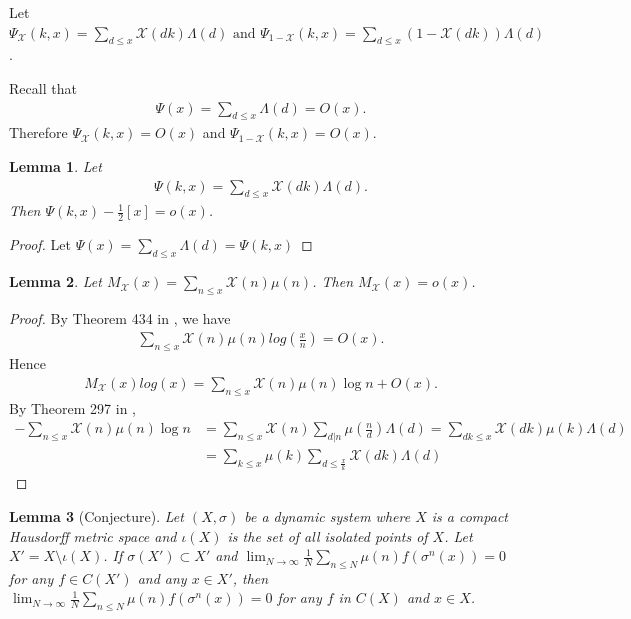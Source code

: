 \documentclass[a4paper,10pt]{amsart}
\newtheorem{lemma}{Lemma}[section]
\newcommand{\X}{\mathcal X}
\begin{document}
Let $\Psi_{\X}(k,x) = \sum_{d \leq x}\X(dk)\Lambda(d) \mbox{ and }
\Psi_{1-\X}(k,x) = \sum_{d \leq x}(1-\X(dk))\Lambda(d)$.

Recall that
\begin{align*}
    \Psi(x) = \sum_{d \leq x}\Lambda(d) = O(x).
\end{align*}
Therefore $\Psi_{\X}(k,x) = O(x)$ and $\Psi_{1-\X}(k,x) = O(x)$.

\begin{lemma}
    Let 
    \begin{align*}
        \Psi(k,x) = \sum_{d \leq x}\X(dk)\Lambda(d).
    \end{align*} 
    Then $\Psi(k,x) - \frac{1}{2}[x] = o(x)$.
\end{lemma}

\begin{proof}
   Let $\Psi(x) = \sum_{d \leq x}\Lambda(d) = \Psi(k,x)$ 
\end{proof}

\begin{lemma}
    Let $M_{\X}(x) = \sum_{n \leq x}\X(n)\mu(n)$. Then
    $M_{\X}(x) = o(x)$. 
\end{lemma}

\begin{proof}
    By Theorem 434 in \cite{HW}, we have
    \begin{align*}
        \sum_{n \leq x} \X(n)\mu(n)log(\frac{x}{n}) = O(x). 
    \end{align*}
    Hence
    \begin{align*}
        M_{\X}(x)log(x) = \sum_{n \leq x}\X(n)\mu(n)\log n + O(x).    
    \end{align*}
    By Theorem 297 in \cite{HW},
    \begin{align*}
        -\sum_{n \leq x}\X(n)\mu(n)\log n 
        &= \sum_{n \leq x}\X(n)\sum_{d | n}
        \mu(\frac{n}{d})\Lambda(d)
        = \sum_{dk \leq x}\X(dk)\mu(k)\Lambda(d)\\
        & = \sum_{k \leq x} \mu(k)\sum_{d \leq \frac{x}{k}}\X(dk)\Lambda(d)
    \end{align*}
\end{proof}

\begin{lemma}[Conjecture]
    Let $(X, \sigma)$ be a dynamic system where $X$ is a compact 
    Hausdorff metric space and $\iota(X)$ is the set of 
    all isolated points of $X$. Let $X' = X \setminus \iota(X)$. If
    $\sigma(X') \subset X'$ and $\lim_{N \rightarrow \infty}
       \frac{1}{N} \sum_{n \leq N}\mu(n)f(\sigma^{n}(x)) = 0$ for any
    $f \in C(X')$ and any $x \in X'$, then $\lim_{N \rightarrow \infty}
       \frac{1}{N} \sum_{n \leq N}\mu(n)f(\sigma^{n}(x)) = 0$ for any 
    $f$ in $C(X)$ and $x \in X$.
\end{lemma}
\end{document}
